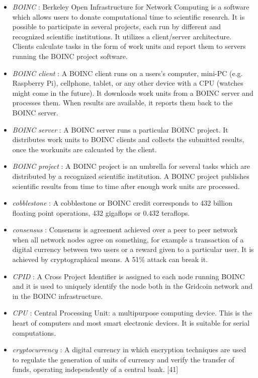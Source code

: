 \begin{itemize}
  \item \textit{BOINC} : Berkeley Open Infrastructure for Network Computing is a software which allows users to donate computational time to scientific research. It is possible to participate in several projects, each run by different and recognized scientific institutions. It utilizes a client/server architecture. Clients calculate tasks in the form of work units and report them to servers running the BOINC project software.
  \item \textit{BOINC client} : A BOINC client runs on a users's computer, mini-PC (e.g. Raspberry Pi), cellphone, tablet, or any other device with a CPU (watches might come in the future). It downloads work units from a BOINC server and processes them. When results are available, it reports them back to the BOINC server.
  \item \textit{BOINC server} : A BOINC server runs a particular BOINC project. It distributes work units to BOINC clients and collects the submitted results, once the workunits are calcuated by the client.
  \item \textit{BOINC project} : A BOINC project is an umbrella for several tasks which are distributed by a recognized scientific institution. A BOINC project publishes scientific results from time to time after enough work units are processed.
  \item \textit{cobblestone} : A cobblestone or BOINC credit corresponds to 432 billion floating point operations, 432 gigaflops or 0.432 teraflops.
  \item \textit{consensus} : Consensus is agreement achieved over a peer to peer network when all network nodes agree on something, for example a transaction of a digital currency between two users or a reward given to a particular user. It is achieved by cryptographical means. A 51\% attack can break it.
  \item \textit{CPID} : A Cross Project Identifier is assigned to each node running BOINC and it is used to uniquely identify the node both in the Gridcoin network and in the BOINC infrastructure.
  \item \textit{CPU} : Central Processing Unit: a multipurpose computing device. This is the heart of computers and most smart electronic devices. It is suitable for serial computations. 
  \item \textit{cryptocurrency} : A digital currency in which encryption techniques are used to regulate the generation of units of currency and verify the transfer of funds, operating independently of a central bank. [41]

\end{itemize}
